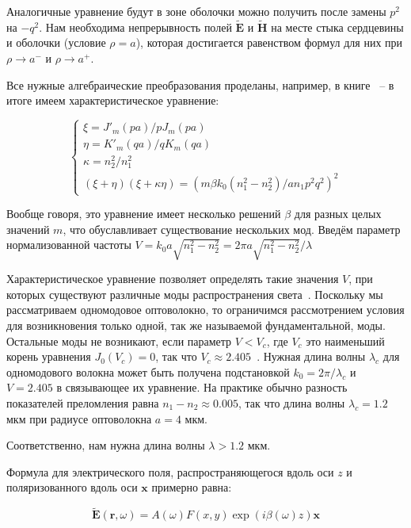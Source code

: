 Аналогичные уравнение будут в зоне оболочки можно получить после замены $p^2$ на $-q^2$.
Нам необходима непрерывность полей $\mathbf{\widetilde{E}}$ и $\mathbf{\widetilde{H}}$ на месте стыка сердцевины и оболочки (условие $\rho = a$), которая достигается равенством формул для них при $\rho \to a^-$ и $\rho \to a^+$.

Все нужные алгебраические преобразования проделаны, например, в книге~\cite{buck2004fundamentals} -- в итоге имеем характеристическое уравнение:

\begin{equation}
	\begin{cases}
		\xi = {J'_m(pa)}/{pJ_m(pa)}  \\
		\eta = {K'_m(qa)}/{qK_m(qa)} \\
		\kappa = {n_2^2}/{n_1^2}     \\
		\left( \xi + \eta \right) \left( \xi + \kappa \eta \right) = \left( {m \beta k_0 (n_1^2-n_2^2)}/{an_1p^2q^2} \right)^2
	\end{cases}
\end{equation}

Вообще говоря, это уравнение имеет несколько решений $\beta$ для разных целых значений $m$, что обуславливает существование нескольких мод.
Введём параметр нормализованной частоты $V = k_0 a \sqrt{n_1^2-n_2^2} = 2 \pi a \sqrt{n_1^2-n_2^2} / \lambda$

Характеристическое уравнение позволяет определять такие значения $V$, при которых существуют различные моды распространения света~\cite{agrawal2007nonlinear, marcuse1991theory}.
Поскольку мы рассматриваем одномодовое оптоволокно, то ограничимся рассмотрением условия для возникновения только одной, так же называемой фундаментальной, моды.
Остальные моды не возникают, если параметр $V<V_c$, где $V_c$ это наименьший корень уравнения $J_0(V_c)=0$, так что $V_c \approx 2.405$~\cite{agrawal2007nonlinear}.
Нужная длина волны $\lambda_c$ для одномодового волокна может быть получена подстановкой $k_0=2\pi/\lambda_c$ и $V=2.405$ в связывающее их уравнение.
На практике обычно разность показателей преломления равна $n_1-n_2 \approx 0.005$, так что длина волны $\lambda_c = 1.2$ мкм при радиусе оптоволокна $a=4$ мкм.

Соответственно, нам нужна длина волны $\lambda > 1.2$ мкм.

Формула для электрического поля, распространяющегося вдоль оси $z$ и поляризованного вдоль оси $\mathbf{x}$ примерно равна:

\begin{equation}
	\mathbf{\widetilde{E}}{(\mathbf{r}, \omega)} = A(\omega) F(x, y) \exp{(i \beta(\omega) z )} \mathbf{x}
\end{equation}

